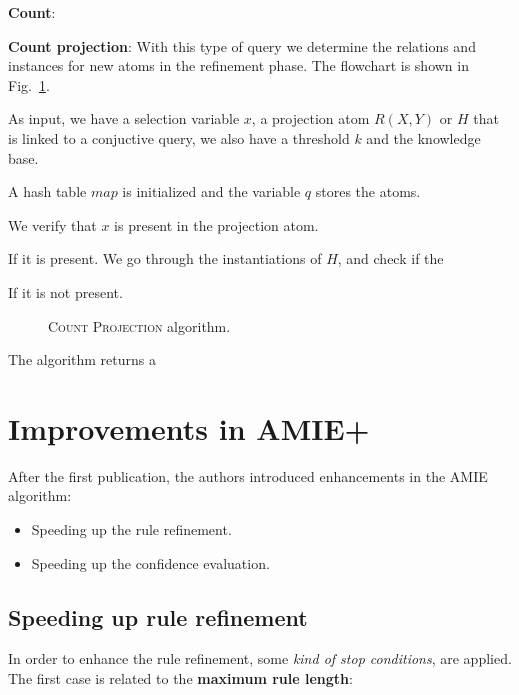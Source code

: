 \documentclass{article}
\begin{document}
\noindent \textbf{Count}:

\noindent \textbf{Count projection}: With this type of query we determine the
relations and instances for new atoms in the refinement phase. The flowchart is
shown in Fig.~\ref{fig:select_distinct}.

As input, we have a selection variable $x$, a projection atom $R(X, Y)$ or $H$ that is
linked to a conjuctive query, we also have a threshold $k$ and the knowledge
base.

A hash table $map$ is initialized and the variable $q$ stores the atoms.

We verify that $x$ is present in the projection atom.

If it is present. We go through the instantiations of $H$, and check if the

If it is not present.

\begin{figure}[H]
\centering
    \resizebox{!}{0.65\textheight}{%
    
    }
    \caption[\textsc{Count Projection} algorithm.]
    {\textsc{Count Projection} algorithm.
        \newline \newline
    }
    \label{fig:select_distinct}
\end{figure}

The algorithm returns a

\section{Improvements in AMIE+}

After the first publication, the authors introduced enhancements in the AMIE algorithm:

\begin{itemize}
    \item Speeding up the rule refinement.
    \item Speeding up the confidence evaluation.
\end{itemize}

\subsection{Speeding up rule refinement}

In order to enhance the rule refinement, some \textit{kind of stop conditions},
are applied. The first case is related to the \textbf{maximum rule length}:
\end{document}
